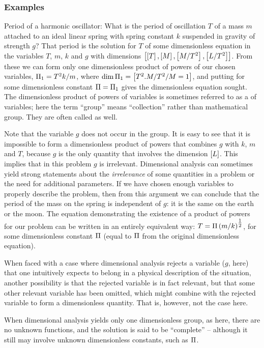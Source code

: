 \subsubsection{Examples}
Period of a harmonic oscillator: What is the period of oscillation $T$ of a mass $m$ attached to an ideal linear spring with spring constant $k$ suspended in gravity of strength $g$? That period is the solution for $T$ of some dimensionless equation in the variables $T$, $m$, $k$ and $g$ with dimensions $\left[{\left[{T}\right], \left[{M}\right], \left[{M/T^2}\right], \left[{L/T^2}\right]}\right]$. From these we can form only one dimensionless product of powers of our chosen variables, $\Pi_1 = T^2 k/m$, where $\dim\Pi_1 = \left[{T^2.M/T^2/M = 1}\right]$, and putting  for some dimensionless constant $\Pi = \Pi_1$ gives the dimensionless equation sought. The dimensionless product of powers of variables is sometimes referred to as a  of variables; here the term ``group'' means ``collection'' rather than mathematical group. They are often called  as well.

Note that the variable $g$ does not occur in the group. It is easy to see that it is impossible to form a dimensionless product of powers that combines $g$ with $k$, $m$ and $T$, because $g$ is the only quantity that involves the dimension $\left[{L}\right]$. This implies that in this problem $g$ is irrelevant. Dimensional analysis can sometimes yield strong statements about the \emph{irrelevance} of some quantities in a problem or the need for additional parameters. If we have chosen enough variables to properly describe the problem, then from this argument we can conclude that the period of the mass on the spring is independent of $g$: it is the same on the earth or the moon. The equation demonstrating the existence of a product of powers for our problem can be written in an entirely equivalent way: $T = \Pi\left({m/k}\right)^{\tfrac{1}{2}}$, for some dimensionless constant $\Pi$ (equal to $\Pi$ from the original dimensionless equation).

When faced with a case where dimensional analysis rejects a variable ($g$, here) that one intuitively expects to belong in a physical description of the situation, another possibility is that the rejected variable is in fact relevant, but that some other relevant variable has been omitted, which might combine with the rejected variable to form a dimensionless quantity. That is, however, not the case here.

When dimensional analysis yields only one dimensionless group, as here, there are no unknown functions, and the solution is said to be ``complete'' -- although it still may involve unknown dimensionless constants, such as $\Pi$.

